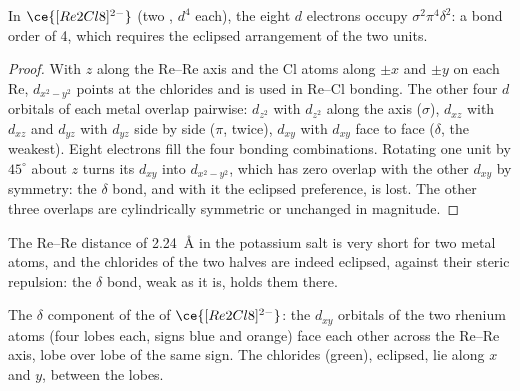 \begin{proposition}\label{prop:b3:organometallic-bonding:quadruple}
In $\ce{[Re2Cl8]^{2-}}$ (two , $d^4$ each), the eight $d$ electrons occupy $\sigma^2\pi^4\delta^2$: a bond
order of 4, which requires the eclipsed arrangement of the two  units.
\end{proposition}

\begin{proof}
With $z$ along the Re--Re axis and the Cl atoms along $\pm x$ and $\pm y$ on each Re, $d_{x^2-y^2}$
points at the chlorides and is used in Re--Cl bonding. The other four $d$ orbitals
of each metal overlap pairwise: $d_{z^2}$ with $d_{z^2}$ along the axis ($\sigma$), $d_{xz}$ with $d_{xz}$ and $d_{yz}$
with $d_{yz}$ side by side ($\pi$, twice), $d_{xy}$ with $d_{xy}$ face to face ($\delta$, the weakest).
Eight electrons fill the four bonding combinations. Rotating one unit by $45^\circ$
about $z$ turns its $d_{xy}$ into $d_{x^2-y^2}$, which has zero overlap with the other $d_{xy}$ by
symmetry: the $\delta$ bond, and with it the eclipsed preference, is lost. The
other three overlaps are cylindrically symmetric or unchanged in magnitude.
\end{proof}

The Re--Re distance of \qty{2.24}{\AA} in the potassium salt is very short for two metal atoms, and the chlorides of the two halves are indeed eclipsed, against
their steric repulsion: the $\delta$ bond, weak as it is, holds them there.

\begin{omfigure}

{\small The $\delta$ component of the  of $\ce{[Re2Cl8]^{2-}}$: the $d_{xy}$ orbitals of
the two rhenium atoms (four lobes each, signs blue and orange) face each other
across the Re--Re axis, lobe over lobe of the same sign. The chlorides (green),
eclipsed, lie along $x$ and $y$, between the lobes.}
\end{omfigure}

